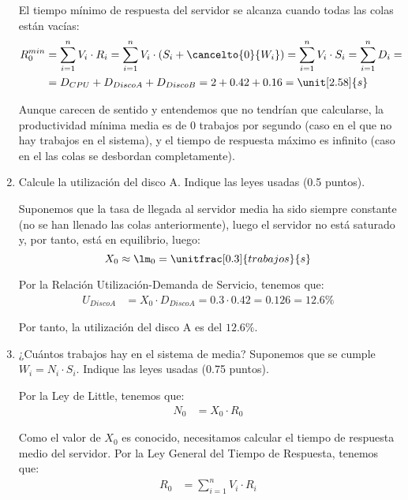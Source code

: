 \documentclass[12pt]{article}
\begin{document}
\begin{ejercicio}[2 puntos]
\begin{enumerate}
            El tiempo mínimo de respuesta del servidor se alcanza cuando todas las colas están vacías:
            \begin{align*}
                R_{0}^{min} &= \sum_{i=1}^{n} V_i\cdot R_i = \sum_{i=1}^{n} V_i\cdot (S_i + \cancelto{0}{W_i})
                = \sum_{i=1}^{n} V_i\cdot S_i
                = \sum_{i=1}^{n} D_i
                =\\&= D_{CPU} + D_{Disco A} + D_{Disco B} = 2 + 0.42 + 0.16 = \unit[2.58]{s}
            \end{align*}

            Aunque carecen de sentido y entendemos que no tendrían que calcularse, la productividad mínima media es de $0$ trabajos por segundo (caso en el que no hay trabajos en el sistema), y el tiempo de respuesta máximo es infinito (caso en el las colas se desbordan completamente).
            \item Calcule la utilización del disco A. Indique las leyes usadas (0.5 puntos).
            
            Suponemos que la tasa de llegada al servidor media ha sido siempre constante (no se han llenado las colas anteriormente), luego el servidor no está saturado y, por tanto, está en equilibrio, luego:
            \begin{equation*}
                X_0 \approx \lm_0 = \unitfrac[0.3]{trabajos}{s}
            \end{equation*}

            Por la Relación Utilización-Demanda de Servicio, tenemos que:
            \begin{align*}
                U_{Disco A} &= X_0\cdot D_{Disco A} = 0.3\cdot 0.42 = 0.126 = 12.6\%
            \end{align*}

            Por tanto, la utilización del disco A es del $12.6\%$.
            
            
            \item ¿Cuántos trabajos hay en el sistema de media? Suponemos que se cumple $W_i = N_i\cdot S_i$. Indique las leyes usadas (0.75 puntos).
            
            Por la Ley de Little, tenemos que:
            \begin{align*}
                N_0 &= X_0\cdot R_0
            \end{align*}

            Como el valor de $X_0$ es conocido, necesitamos calcular el tiempo de respuesta medio del servidor. Por la Ley General del Tiempo de Respuesta, tenemos que:
            \begin{align*}
                R_0 &= \sum_{i=1}^{n} V_i\cdot R_i
            \end{align*}



\end{enumerate}
\end{ejercicio}
\end{document}

